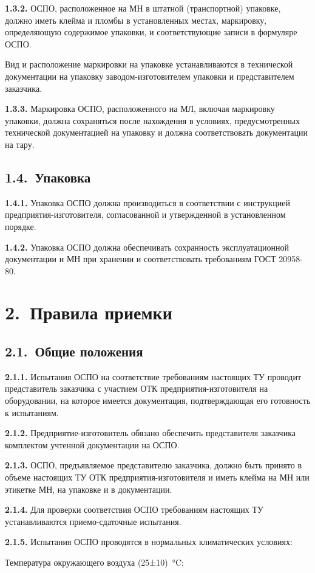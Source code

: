 \documentclass[11pt,a4paper]{article}
\begin{document}
\par\textbf{1.3.2.} ОСПО, расположенное на МН в штатной (транспортной) упаковке, должно иметь клейма и пломбы в установленных местах, маркировку, определяющую содержимое упаковки, и соответствующие записи в формуляре ОСПО.\par
Вид и расположение маркировки на упаковке устанавливаются в технической документации на упаковку заводом-изготовителем упаковки и представителем заказчика.

\par\textbf{1.3.3.} Маркировка ОСПО, расположенного на МЛ, включая маркировку упаковки, должна сохраняться после нахождения в условиях, предусмотренных технической документацией на упаковку и должна соответствовать документации на тару.\par
\subsection*{1.4.~Упаковка}
\par\textbf{1.4.1.} Упаковка ОСПО должна производиться в соответствии с инструкцией предприятия-изготовителя, согласованной и утвержденной в установленном порядке.\par
\par\textbf{1.4.2.} Упаковка ОСПО должна обеспечивать сохранность эксплуатационной документации и МН при хранении и соответствовать требованиям ГОСТ 20958-80.\par
\section*{2.~Правила приемки}
\subsection*{2.1.~Общие положения}
\par\textbf{2.1.1.} Испытания ОСПО на соответствие требованиям настоящих ТУ проводит представитель заказчика с участием ОТК предприятия-изготовителя на оборудовании, на которое имеется документация, подтверждающая его готовность к испытаниям.\par
\par\textbf{2.1.2.} Предприятие-изготовитель обязано обеспечить представителя заказчика комплектом учтенной документации на ОСПО.\par
\par\textbf{2.1.3.} ОСПО, предъявляемое представителю заказчика, должно быть принято в объеме настоящих ТУ ОТК предприятия-изготовителя и иметь клейма на МН или этикетке МН, на упаковке и в документации.\par
\par\textbf{2.1.4.} Для проверки соответствия ОСПО требованиям настоящих ТУ устанавливаются приемо-сдаточные испытания.\par
\par\textbf{2.1.5.} Испытания ОСПО проводятся в нормальных климатических условиях:\par
Температура окружающего воздуха (25±10)~°C;
\end{document}
